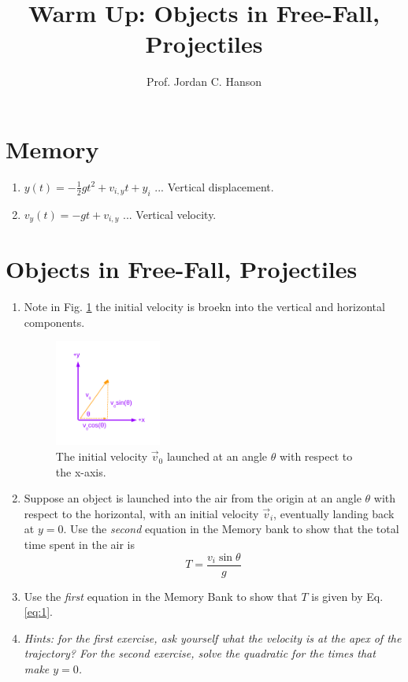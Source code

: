 \documentclass{article}
\begin{document}
\title{Warm Up: Objects in Free-Fall, Projectiles}
\author{Prof. Jordan C. Hanson}

\maketitle

\section{Memory}

\begin{enumerate}
\item $y(t) = -\frac{1}{2}g t^2 + v_{i,y} t + y_i$ ... Vertical displacement.
\item $v_y(t) = -g t + v_{i,y}$ ... Vertical velocity.
\end{enumerate}

\section{Objects in Free-Fall, Projectiles}

\begin{enumerate}
\item Note in Fig. \ref{fig:1} the initial velocity is broekn into the vertical and horizontal components.
\begin{figure}[ht]
\centering
\includegraphics[width=0.33\textwidth,trim=0cm 1.25cm 0cm 1cm,clip=true]{figures/Vectors1.pdf}
\caption{\label{fig:1} The initial velocity $\vec{v}_0$ launched at an angle $\theta$ with respect to the x-axis.}
\end{figure}
\item Suppose an object is launched into the air from the origin at an angle $\theta$ with respect to the horizontal, with an initial velocity $\vec{v}_{i}$, eventually landing back at $y=0$.  Use the \textit{second} equation in the Memory bank to show that the total time spent in the air is 
\begin{equation}
T = \frac{v_i \sin\theta}{g} \label{eq:1}
\end{equation}
\item Use the \textit{first} equation in the Memory Bank to show that $T$ is given by Eq. \ref{eq:1}. \\ \vspace{5cm}
\item \textit{Hints: for the first exercise, ask yourself what the velocity is at the apex of the trajectory?  For the second exercise, solve the quadratic for the times that make $y=0$.}
\end{enumerate}
\end{document}
